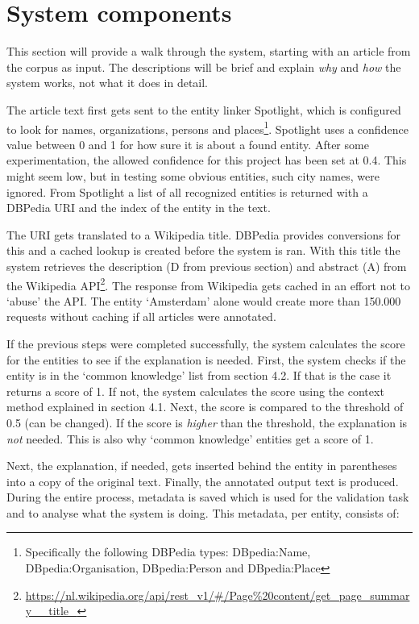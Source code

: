 \documentclass[
10pt, %
a4paper, %
oneside, %
headinclude,footinclude, %
] {book}%
\begin{document}
\section{System components}
This section will provide a walk through the system, starting with an article from the corpus as input.
The descriptions will be brief and explain \textit{why} and \textit{how} the system works, not what it does in detail.

The article text first gets sent to the entity linker Spotlight, which is configured to look for names, organizations, persons and places\footnote{Specifically the following DBPedia types: DBpedia:Name, DBpedia:Organisation, DBpedia:Person and DBpedia:Place}.
Spotlight uses a confidence value between 0 and 1 for how sure it is about a found entity.
After some experimentation, the allowed confidence for this project has been set at 0.4.
This might seem low, but in testing some obvious entities, such city names, were ignored.
From Spotlight a list of all recognized entities is returned with a DBPedia URI and the index of the entity in the text.

The URI gets translated to a Wikipedia title.
DBPedia provides conversions for this and a cached lookup is created before the system is ran.
With this title the system retrieves the description (D from previous section) and abstract (A) from the Wikipedia API\footnote{\url{https://nl.wikipedia.org/api/rest_v1/\#/Page\%20content/get_page_summary__title_}}.
The response from Wikipedia gets cached in an effort not to `abuse' the API.
The entity `Amsterdam' alone would create more than 150.000 requests without caching if all articles were annotated.

If the previous steps were completed successfully, the system calculates the score for the entities to see if the explanation is needed.
First, the system checks if the entity is in the `common knowledge' list from section 4.2.
If that is the case it returns a score of 1.
If not, the system calculates the score using the context method explained in section 4.1.
Next, the score is compared to the threshold of 0.5 (can be changed).
If the score is \textit{higher} than the threshold, the explanation is \textit{not} needed.
This is also why `common knowledge' entities get a score of 1.

Next, the explanation, if needed, gets inserted behind the entity in parentheses into a copy of the original text.
Finally, the annotated output text is produced.
During the entire process, metadata is saved which is used for the validation task and to analyse what the system is doing.
This metadata, per entity, consists of:
\end{document}
